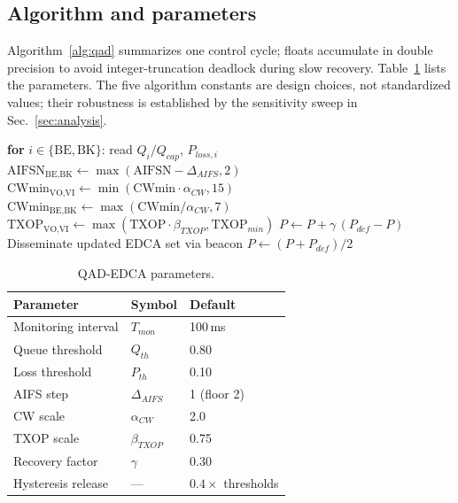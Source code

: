 \documentclass[conference]{IEEEtran}
\begin{document}
\subsection{Algorithm and parameters}
Algorithm~\ref{alg:qad} summarizes one control cycle; floats accumulate in
double precision to avoid integer-truncation deadlock during slow recovery.
Table~\ref{tab:params} lists the parameters. The five algorithm constants are
design choices, not standardized values; their robustness is established by
the sensitivity sweep in Sec.~\ref{sec:analysis}.

\begin{algorithm}[t]
\caption{QAD-EDCA control cycle (run at the AP every $T_{mon}$)}
\label{alg:qad}
\begin{algorithmic}[1]
\State \textbf{for} $i\in\{\text{BE},\text{BK}\}$: read $Q_i/Q_{cap}$, $P_{loss,i}$
  \State $\text{AIFSN}_{\text{BE},\text{BK}}\gets\max(\text{AIFSN}-\Delta_{AIFS},2)$
  \State $\text{CWmin}_{\text{VO},\text{VI}}\gets\min(\text{CWmin}\cdot\alpha_{CW},15)$
  \State $\text{CWmin}_{\text{BE},\text{BK}}\gets\max(\text{CWmin}/\alpha_{CW},7)$
  \State $\text{TXOP}_{\text{VO},\text{VI}}\gets\max(\text{TXOP}\cdot\beta_{TXOP},\text{TXOP}_{min})$
\Else
    \State $P\gets P+\gamma\,(P_{def}-P)$ 
  \EndFor
\EndIf
\State Disseminate updated EDCA set via beacon
  \State $P\gets (P+P_{def})/2$ 
\EndIf
\end{algorithmic}
\end{algorithm}

\begin{table}[t]
\centering
\caption{QAD-EDCA parameters.}
\label{tab:params}
\begin{tabular}{@{}lll@{}}
\toprule
Parameter & Symbol & Default\\
\midrule
Monitoring interval & $T_{mon}$ & 100\,ms\\
Queue threshold & $Q_{th}$ & 0.80\\
Loss threshold & $P_{th}$ & 0.10\\
AIFS step & $\Delta_{AIFS}$ & 1 (floor 2)\\
CW scale & $\alpha_{CW}$ & 2.0\\
TXOP scale & $\beta_{TXOP}$ & 0.75\\
Recovery factor & $\gamma$ & 0.30\\
Hysteresis release & --- & $0.4\times$ thresholds\\
\bottomrule
\end{tabular}
\end{table}
\end{document}

